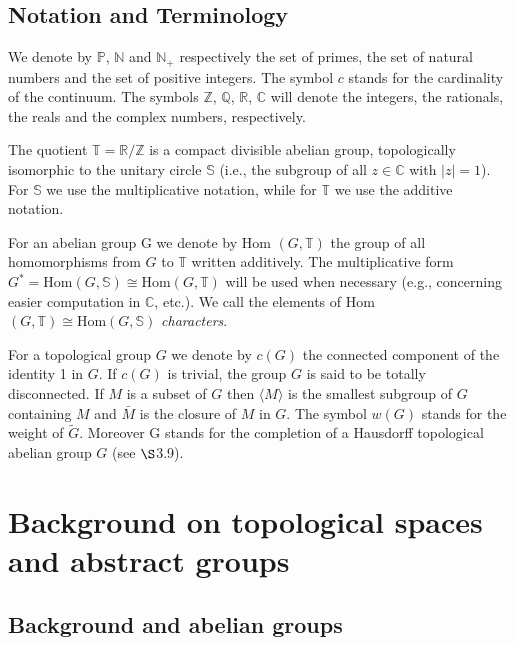 \documentclass[12pt]{article}
\begin{document}
    \tableofcontents


    \subsection{Notation and Terminology}
            We denote by $\mathbb{P}$, $\mathbb{N}$ and $\mathbb{N}_+$ respectively the set of primes, the set of natural numbers and the set of positive
        integers. The symbol $c$ stands for the cardinality of the continuum. The symbols $\mathbb{Z}$, $\mathbb{Q}$, $\mathbb{R}$, $\mathbb{C}$ will denote the
        integers, the rationals, the reals and the complex numbers, respectively.
        

            The quotient $\mathbb{T} = \mathbb{R}/\mathbb{Z}$ is a compact divisible abelian group, topologically isomorphic to the unitary circle $\mathbb{S}$
        (i.e., the subgroup of all $z \in \mathbb{C}$ with $|z| = 1$). For $\mathbb{S}$ we use the multiplicative notation, while for $\mathbb{T}$ we use the
        additive notation.
        

            For an abelian group G we denote by Hom $(G,\mathbb{T})$ the group of all homomorphisms from $G$ to $\mathbb{T}$ written
        additively. The multiplicative form $G^* = \text{Hom} (G, \mathbb{S}) \cong \text{Hom} (G,\mathbb{T})$ will be used when necessary (e.g., concerning
        easier computation in $\mathbb{C}$, etc.). We call the elements of Hom $(G,\mathbb{T}) \cong \text{Hom} (G, \mathbb{S})$ \emph{characters}.
        

            For a topological group $G$ we denote by $c(G)$ the connected component of the identity 1 in $G$. If $c(G)$ is
        trivial, the group $G$ is said to be totally disconnected. If $M$ is a subset of $G$ then $\langle M \rangle$ is the smallest subgroup
        of $G$ containing $M$ and $\bar{M}$ is the closure of $M$ in $G$. The symbol $w(G)$ stands for the weight of $\tilde{G}$. Moreover G
        stands for the completion of a Hausdorff topological abelian group $G$ (see $\S$3.9).


\section{Background on topological spaces and abstract groups}


    \subsection{Background and abelian groups}
\end{document}
